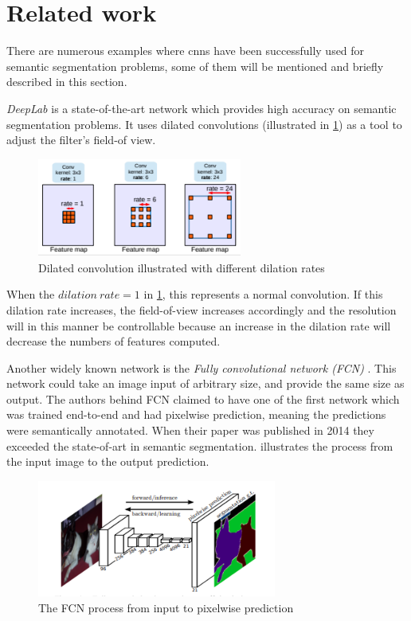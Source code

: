 \documentclass[USenglish]{ifimaster}  %
\begin{document}
\section{Related work}
There are numerous examples where \acp{cnn} have been successfully used for semantic segmentation problems, some of them will be mentioned and briefly described in this section. 

\textit{DeepLab} \cite{website:deeplab_article} is a state-of-the-art network which provides high accuracy on semantic segmentation problems. It uses dilated convolutions (illustrated in \cref{fig:dilated_conv}) as a tool to adjust the filter's field-of view. 

\begin{figure}[ht]
    \centering
    \includegraphics[width=0.6\textwidth]{bilder/dilation.png}
    \caption{Dilated convolution illustrated with different dilation rates \cite{website:deeplab_article}}
    \label{fig:dilated_conv}
\end{figure}

When the $dilation\ rate=1$ in \cref{fig:dilated_conv}, this represents a normal convolution. If this dilation rate increases, the field-of-view increases accordingly and the resolution will in this manner be controllable because an increase in the dilation rate will decrease the numbers of features computed. 

Another widely known network is the \textit{Fully convolutional network (FCN)} \cite{website:fcn}. This network could take an image input of arbitrary size, and provide the same size as output. The authors behind FCN claimed to have one of the first network which was trained end-to-end and had pixelwise prediction, meaning the predictions were semantically annotated. When their paper was published in 2014 they exceeded the state-of-art in semantic segmentation.  illustrates the process from the input image to the output prediction.      

\begin{figure}[ht]
    \centering
    \includegraphics[width=0.7\textwidth]{bilder/fcn.png}
    \caption{The FCN process from input to pixelwise prediction \cite{website:fcn}}
    \label{fig:fcn}
\end{figure}
\end{document}
